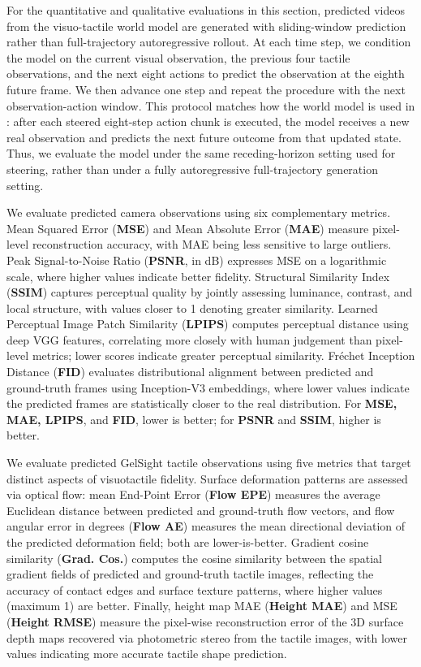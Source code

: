 For the quantitative and qualitative evaluations in this section, predicted videos from the visuo-tactile world model are generated with sliding-window prediction rather than full-trajectory autoregressive rollout. At each time step, we condition the model on the current visual observation, the previous four tactile observations, and the next eight actions to predict the observation at the eighth future frame. We then advance one step and repeat the procedure with the next observation-action window. This protocol matches how the world model is used in \ours: after each steered eight-step action chunk is executed, the model receives a new real observation and predicts the next future outcome from that updated state. Thus, we evaluate the model under the same receding-horizon setting used for steering, rather than under a fully autoregressive full-trajectory generation setting.



 We evaluate predicted camera observations using six complementary metrics. Mean	
Squared Error (\textbf{MSE}) and Mean Absolute Error (\textbf{MAE}) measure pixel-level reconstruction accuracy, with MAE being			
less sensitive to large outliers. Peak Signal-to-Noise Ratio (\textbf{PSNR}, in dB) expresses MSE on a logarithmic scale,			
where higher values indicate better fidelity. Structural Similarity Index (\textbf{SSIM}) captures perceptual quality by			
jointly assessing luminance, contrast, and local structure, with values closer to 1 denoting greater similarity.			
Learned Perceptual Image Patch Similarity (\textbf{LPIPS}) computes perceptual distance using deep VGG features,			
correlating more closely with human judgement than pixel-level metrics; lower scores indicate greater perceptual			
similarity. Fréchet Inception Distance (\textbf{FID}) evaluates distributional alignment between predicted and			
ground-truth frames using Inception-V3 embeddings, where lower values indicate the predicted frames are			
statistically closer to the real distribution. For \textbf{MSE, MAE, LPIPS}, and \textbf{FID}, lower is better; for \textbf{PSNR} and \textbf{SSIM},			
higher is better.			
			
 We evaluate predicted GelSight tactile observations using five metrics that target			
distinct aspects of visuotactile fidelity. Surface deformation patterns are assessed via optical flow: mean			
End-Point Error (\textbf{Flow EPE}) measures the average Euclidean distance between predicted and ground-truth flow vectors,			
and flow angular error in degrees (\textbf{Flow AE}) measures the mean directional deviation of the predicted deformation field; both			
are lower-is-better. Gradient cosine similarity (\textbf{Grad. Cos.}) computes the cosine similarity between the spatial gradient			
fields of predicted and ground-truth tactile images, reflecting the accuracy of contact edges and surface texture			
patterns, where higher values (maximum 1) are better. Finally, height map MAE (\textbf{Height MAE}) and MSE (\textbf{Height RMSE}) measure the pixel-wise			
reconstruction error of the 3D surface depth maps recovered via photometric stereo from the tactile images, with			
lower values indicating more accurate tactile shape prediction.	

